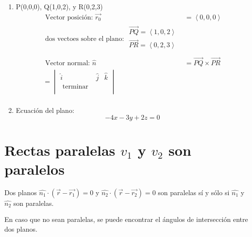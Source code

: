 \begin{enumerate}
    
    \item P(0,0,0), Q(1,0,2), y R(0,2,3)
    \begin{align*}
        \text{  Vector posición: } \vec{r_0} & = \left\langle 0,0,0 \right\rangle \\ 
          \text{ dos  vectoes sobre el plano:  } \begin{matrix*}
             \vec{PQ} = \left\langle 1,0,2 \right\rangle \\ 
             \vec{PR} = \left\langle 0,2,3 \right\rangle  \\ 
         \end{matrix*} \\ 
        \text{  Vector normal:  } \hat{n} & = \overrightarrow{PQ} \times  \overrightarrow{PR} \\ 
          = \begin{vmatrix}
             \hat{i} & \hat{j} & \hat{k} \\
              \text{  terminar  } \\
         \end{vmatrix} \\
    \end{align*}
    
    \item Ecuación del plano:
    \[
      -4x-3y+2z=0
    \]
\end{enumerate}

 \section{Rectas paralelas $v_1$ y $v_2$ son paralelos}
Dos planos $\hat{n_1} \cdot (\vec{r}- \vec{r_1})= 0$ y $\hat{n_2} \cdot ( \vec{r}- \vec{r_2}) = 0$ son paralelas sí y sólo si $\hat{n_1}$ y $\hat{n_2}$ son paralelas.

 En caso que no sean paralelas, se puede encontrar el ángulos de intersección entre dos planos.

























